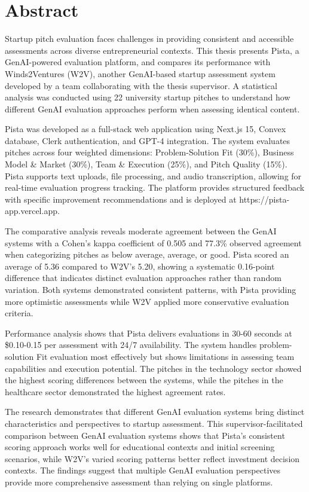 \chapter*{Abstract}
Startup pitch evaluation faces challenges in providing consistent and accessible assessments across diverse entrepreneurial contexts. This thesis presents Pista, a GenAI-powered evaluation platform, and compares its performance with Winds2Ventures (W2V), another GenAI-based startup assessment system developed by a team collaborating with the thesis supervisor. A statistical analysis was conducted using 22 university startup pitches to understand how different GenAI evaluation approaches perform when assessing identical content.

Pista was developed as a full-stack web application using Next.js 15, Convex database, Clerk authentication, and GPT-4 integration. The system evaluates pitches across four weighted dimensions: Problem-Solution Fit (30\%), Business Model \& Market (30\%), Team \& Execution (25\%), and Pitch Quality (15\%). Pista supports text uploads, file processing, and audio transcription, allowing for real-time evaluation progress tracking. The platform provides structured feedback with specific improvement recommendations and is deployed at https://pista-app.vercel.app.

The comparative analysis reveals moderate agreement between the GenAI systems with a Cohen's kappa coefficient of 0.505 and 77.3\% observed agreement when categorizing pitches as below average, average, or good. Pista scored an average of 5.36 compared to W2V's 5.20, showing a systematic 0.16-point difference that indicates distinct evaluation approaches rather than random variation. Both systems demonstrated consistent patterns, with Pista providing more optimistic assessments while W2V applied more conservative evaluation criteria.

Performance analysis shows that Pista delivers evaluations in 30-60 seconds at \$0.10-0.15 per assessment with 24/7 availability. The system handles problem-solution Fit evaluation most effectively but shows limitations in assessing team capabilities and execution potential. The pitches in the technology sector showed the highest scoring differences between the systems, while the pitches in the healthcare sector demonstrated the highest agreement rates.

The research demonstrates that different GenAI evaluation systems bring distinct characteristics and perspectives to startup assessment. This supervisor-facilitated comparison between GenAI evaluation systems shows that Pista's consistent scoring approach works well for educational contexts and initial screening scenarios, while W2V's varied scoring patterns better reflect investment decision contexts. The findings suggest that multiple GenAI evaluation perspectives provide more comprehensive assessment than relying on single platforms.

